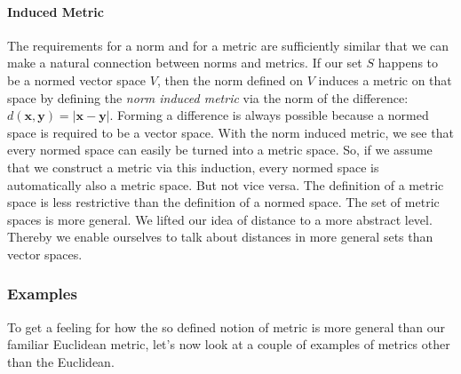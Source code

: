 



\paragraph{Induced Metric}
The requirements for a norm and for a metric are sufficiently similar that we can make a natural connection between norms and metrics. If our set $S$ happens to be a normed vector space $V$, then the norm defined on $V$ induces a metric on that space by defining the \emph{norm induced metric} via the norm of the difference: $d(\mathbf{x, y}) = |\mathbf{x-y}|$. Forming a difference is always possible because a normed space is required to be a vector space. With the norm induced metric, we see that every normed space can easily be turned into a metric space. So, if we assume that we construct a metric via this induction, every normed space is automatically also a metric space. But not vice versa. The definition of a metric space is less restrictive than the definition of a normed space. The set of metric spaces is more general. We lifted our idea of distance to a more abstract level. Thereby we enable ourselves to talk about distances in more general sets than vector spaces.

\medskip
[Q: Can we turn this around by saying that a metric induces a norm by defining the norm as distance from the origin $|\mathbf{x}| = d (\mathbf{x, 0})$ whenever our set happens to have some special element $\mathbf{0}$ that we call the origin?]

\subsubsection{Examples} To get a feeling for how the so defined notion of metric is more general than our familiar Euclidean metric, let's now look at a couple of examples of metrics other than the Euclidean. 

